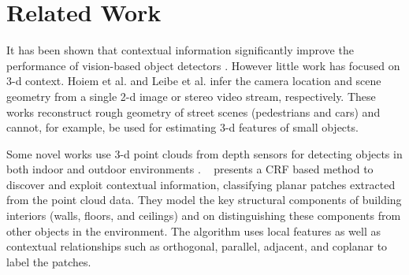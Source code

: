 \documentclass[11pt]{article} %
\begin{document}
\begin{comment}
   \subsection{Method}
     The image is first segmented into smaller point clouds based on segmentation using both image and point cloud features. We define a
     MRF structure, where each segment forms a node in the graph and each segment is connected to its k-nearest neighbors via relation links.
     The various relations we define between objects are: orthogonal, parallel, adjacent, coplanar, self/same-object, above, below, on-top-of, 
     in-front-of, beside, in-proximity, etc. The node potentials will depend on local visual and shape features, and the edge potentials will depend 
     on the contextual relations between the two nodes.

      
   \subsection{Evaluation}
     We evaluate our scene understanding method by measuring the accuracy of semantic labeling on the test set ie., percent of objects labeled 
     correctly. The test sets will comprise of different types of office spaces: 1. new office spaces which weren't used in the training of the model, 
     2. similar office spaces but new rooms, and 
     3. same office spaces but data collected on a different day. 
     
 \end{comment}
     
     
 \section{Related Work}
 
 
    It has been shown that contextual information significantly improve the performance of vision-based 
   object detectors \cite{Torralba:exploting_context, Hoiem:puttingobjects,Torralba:contextualmodels}. However 
   little work has focused on 3-d context. Hoiem et al. \cite{Hoiem:puttingobjects} and Leibe et al. \cite{Leibe07:dynamic} 
  infer the camera location and scene geometry from a single 2-d image or stereo video stream, respectively. 
  These works reconstruct rough geometry of street scenes (pedestrians and cars) and cannot, for example, 
  be used for estimating 3-d features of small objects.
  
    Some novel works use 3-d point clouds from depth sensors for detecting objects in both indoor and outdoor environments 
    \cite {xiong:indoor,Rusu:ObjectMaps , xiong:3DSceneAnalysis, Golovinskiy:shape-basedrecognition, Shapovalov2010}. 
   ~\cite{xiong:indoor} presents a CRF based method to discover and exploit contextual information, classifying planar patches 
   extracted from the point cloud data. They model the key structural components of building interiors (walls, floors, and ceilings) 
   and on distinguishing these components from other objects in the environment. The algorithm uses local features as well as 
   contextual relationships such as orthogonal, parallel, adjacent, and coplanar to label the patches.
  
\end{document}

